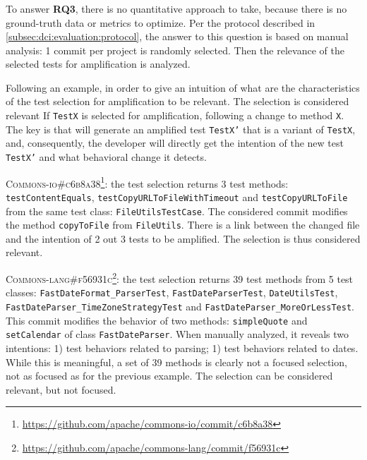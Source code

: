 
\subsubsection{\rqselection}
\label{subsubsec:dci:evaluation:rq3}

To answer \textbf{RQ3}, there is no quantitative approach to take, because there is no ground-truth data or metrics to optimize. 
Per the protocol described in \autoref{subsec:dci:evaluation:protocol}, the answer to this question is based on manual analysis:
1 commit per project is randomly selected.
Then the relevance of the selected tests for amplification is analyzed.

Following an example, in order to give an intuition of what are the characteristics of the test selection for amplification to be relevant.
The selection is considered relevant If \texttt{TestX} is selected for amplification, following a change to method \texttt{X}.
The key is that \DCI will generate an amplified test \texttt{TestX'} that is a variant of \texttt{TestX}, and, consequently, the developer will directly get the intention of the new test \texttt{TestX'} and what behavioral change it detects.

\textsc{Commons-io\#c6b8a38}\footnote{\url{https://github.com/apache/commons-io/commit/c6b8a38}}: the test selection returns 3 test methods: \texttt{testContentEquals}, \texttt{testCopyURLToFileWithTimeout} and \texttt{testCopyURLToFile} from the same test class: \texttt{FileUtilsTestCase}.
The considered commit modifies the method \texttt{copyToFile} from \texttt{FileUtils}.
There is a link between the changed file and the intention of 2 out 3 tests to be amplified.
The selection is thus considered relevant.

\textsc{Commons-lang\#f56931c}\footnote{\url{https://github.com/apache/commons-lang/commit/f56931c}}: the test selection returns 39 test methods from 5 test classes: \texttt{FastDateFormat\_ParserTest}, \texttt{FastDateParserTest}, \texttt{DateUtilsTest}, \texttt{FastDateParser\_TimeZoneStrategyTest} and \texttt{FastDateParser\_MoreOrLessTest}.
This commit modifies the behavior of two methods: \texttt{simpleQuote} and \texttt{setCalendar} of class \texttt{FastDateParser}.
When manually analyzed, it reveals two intentions:
1) test behaviors related to parsing;
1) test behaviors related to dates.
While this is meaningful, a set of 39 methods is clearly not a focused selection, not as focused as for the previous example.
The selection can be considered relevant, but not focused.

